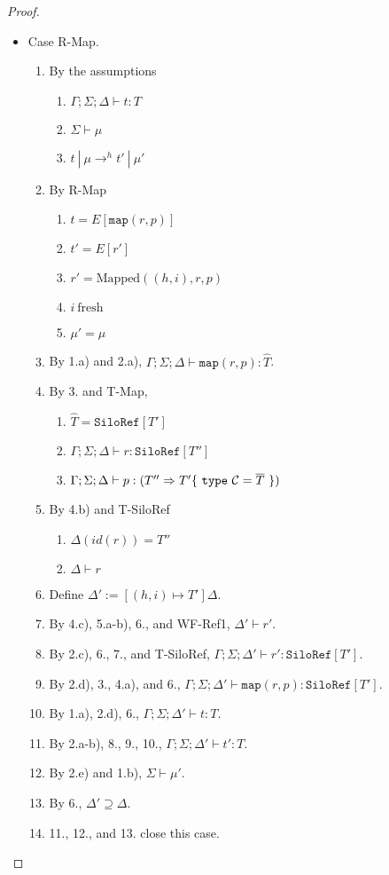 \begin{proof}
\begin{itemize}
\item Case R-Map.
\begin{enumerate}
\item By the assumptions
  \begin{enumerate}[label=(\alph*)]
  \item $\Gamma ; \Sigma ; \Delta \vdash t : T$
  \item $\Sigma \vdash \mu$
  \item $t~|~\mu \rightarrow^h t'~|~\mu'$
  \end{enumerate}
\item By R-Map
  \begin{enumerate}[label=(\alph*)]
  \item $t = E[\texttt{map}(r, p)]$
  \item $t' = E[r']$
  \item $r' = \text{Mapped}((h, i), r, p)$
  \item $i~\text{fresh}$
  \item $\mu' = \mu$
  \end{enumerate}
\item By 1.a) and 2.a), $\Gamma ; \Sigma ; \Delta \vdash \texttt{map}(r, p) : \hat{T}$.
\item By 3. and T-Map,
  \begin{enumerate}[label=(\alph*)]
  \item $\hat{T} = \texttt{SiloRef}[T']$
  \item $\Gamma ; \Sigma ; \Delta \vdash r : \texttt{SiloRef}[T'']$
  \item $\Gamma ; \Sigma ; \Delta \vdash p : (T'' \Rightarrow T' \{~\texttt{type}~\mathcal{C} = \overline{T}~\})$
  \end{enumerate}
\item By 4.b) and T-SiloRef
  \begin{enumerate}[label=(\alph*)]
  \item $\Delta(id(r)) = T''$
  \item $\Delta \vdash r$
  \end{enumerate}
\item Define $\Delta' := [(h, i) \mapsto T']\Delta$.
\item By 4.c), 5.a-b), 6., and WF-Ref1, $\Delta' \vdash r'$.
\item By 2.c), 6., 7., and T-SiloRef, $\Gamma ; \Sigma ; \Delta' \vdash r' : \texttt{SiloRef}[T']$.
\item By 2.d), 3., 4.a), and 6., $\Gamma ; \Sigma ; \Delta' \vdash \texttt{map}(r, p) : \texttt{SiloRef}[T']$.
\item By 1.a), 2.d), 6., $\Gamma ; \Sigma ; \Delta' \vdash t : T$.
\item By 2.a-b), 8., 9., 10., $\Gamma ; \Sigma ; \Delta' \vdash t' : T$.
\item By 2.e) and 1.b), $\Sigma \vdash \mu'$.
\item By 6., $\Delta' \supseteq \Delta$.
\item 11., 12., and 13. close this case.
\end{enumerate}


\end{itemize}
\end{proof}
